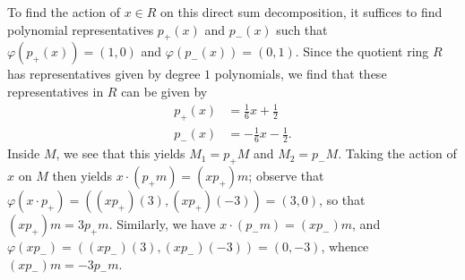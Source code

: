 \documentclass[10pt]{mypackage}
\begin{document}
\begin{solution}
  To find the action of $x\in R$ on this direct sum decomposition, it suffices to find polynomial representatives $p_+(x)$ and $p_{-}(x)$ such that $\varphi\left( p_{+}(x) \right) = \left( 1,0 \right)$ and $\varphi\left( p_{-}(x) \right) = \left( 0,1 \right)$. Since the quotient ring $R$ has representatives given by degree $1$ polynomials, we find that these representatives in $R$ can be given by
  \begin{align*}
    p_{+}(x) &= \frac{1}{6}x + \frac{1}{2}\\
    p_{-}(x) &= -\frac{1}{6}x - \frac{1}{2}.
  \end{align*}
  Inside $M$, we see that this yields $M_1 = p_{+}M$ and $M_2 = p_{-}M$. Taking the action of $x$ on $M$ then yields $x\cdot \left( p_{+}m \right) = \left( x p_{+} \right)m$; observe that $\varphi\left( x\cdot p_{+} \right) = \left( \left( xp_{+} \right)(3),\left( xp_{+} \right)(-3) \right) = \left( 3,0 \right)$, so that $\left( x p_{+} \right)m = 3p_{+}m$. Similarly, we have $x\cdot \left( p_{-}m \right) = \left( xp_{-} \right)m$, and $\varphi\left( xp_{-} \right) = \left( \left( xp_{-} \right)(3),\left( xp_{-} \right)(-3) \right) = \left( 0,-3 \right)$, whence $\left( xp_{-} \right)m = -3p_{-}m$.
\end{solution}
\end{document}
